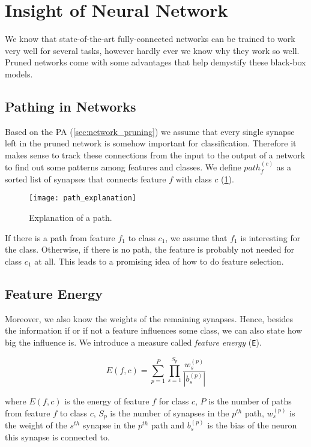 \section{Insight of Neural Network} \label{sec:insight_of_neural_network}
We know that state-of-the-art fully-connected networks can be trained to work very well for several tasks, however hardly ever we know why they work so well. Pruned networks come with some advantages that help demystify these black-box models.

\subsection*{Pathing in Networks}
Based on the PA (\cref{sec:network_pruning}) we assume that every single synapse left in the pruned network is somehow important for classification. Therefore it makes sense to track these connections from the input to the output of a network to find out some patterns among features and classes. We define $ path_f^{(c)} $ as a sorted list of synapses that connects feature $ f $ with class $ c $ (\cref{fig:methods:path_explanation}).

\begin{figure}[H]
  \centering
  \texttt{[image: path\_explanation]}
  \caption{Explanation of a path.}
  \label{fig:methods:path_explanation}
\end{figure}

If there is a path from feature $ f_1 $ to class $ c_1 $, we assume that $ f_1 $ is interesting for the class. Otherwise, if there is no path, the feature is probably not needed for class $ c_1 $ at all. This leads to a promising idea of how to do feature selection.

\subsection*{Feature Energy}
Moreover, we also know the weights of the remaining synapses. Hence, besides the information if or if not a feature influences some class, we can also state how big the influence is. We introduce a measure called \textit{feature energy} (\texttt{E}).

\begin{equation} \label{eq:feature_energy}
E(f,c) = \displaystyle{\sum_{p=1}^{P} \displaystyle{\prod_{s=1}^{S_p} \frac{w_s^{(p)}}{|b_s^{(p)}|}}}
\end{equation}

where $ E(f,c) $ is the energy of feature $ f $ for class $ c $, $ P $ is the number of paths from feature $ f $ to class $ c $, $ S_p $ is the number of synapses in the $ p^{th} $ path, $ w_s^{(p)} $ is the weight of the $ s^{th} $ synapse in the $ p^{th} $ path and $ b_s^{(p)} $ is the bias of the neuron this synapse is connected to.

